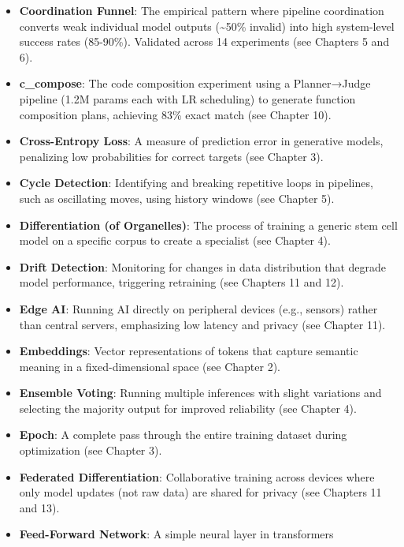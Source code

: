 \documentclass[
]{article}
\begin{document}
\begin{itemize}
  \textbf{Cosine Decay}: A learning rate schedule that smoothly reduces
  the learning rate following a cosine curve after warmup, preventing
  overfitting in later training (see Chapter 3).
\item
  \textbf{Coordination Funnel}: The empirical pattern where pipeline
  coordination converts weak individual model outputs
  (\textasciitilde50\% invalid) into high system-level success rates
  (85-90\%). Validated across 14 experiments (see Chapters 5 and 6).
\item
  \textbf{c\_compose}: The code composition experiment using a
  Planner→Judge pipeline (1.2M params each with LR scheduling) to
  generate function composition plans, achieving 83\% exact match (see
  Chapter 10).
\item
  \textbf{Cross-Entropy Loss}: A measure of prediction error in
  generative models, penalizing low probabilities for correct targets
  (see Chapter 3).
\item
  \textbf{Cycle Detection}: Identifying and breaking repetitive loops in
  pipelines, such as oscillating moves, using history windows (see
  Chapter 5).
\item
  \textbf{Differentiation (of Organelles)}: The process of training a
  generic stem cell model on a specific corpus to create a specialist
  (see Chapter 4).
\item
  \textbf{Drift Detection}: Monitoring for changes in data distribution
  that degrade model performance, triggering retraining (see Chapters 11
  and 12).
\item
  \textbf{Edge AI}: Running AI directly on peripheral devices (e.g.,
  sensors) rather than central servers, emphasizing low latency and
  privacy (see Chapter 11).
\item
  \textbf{Embeddings}: Vector representations of tokens that capture
  semantic meaning in a fixed-dimensional space (see Chapter 2).
\item
  \textbf{Ensemble Voting}: Running multiple inferences with slight
  variations and selecting the majority output for improved reliability
  (see Chapter 4).
\item
  \textbf{Epoch}: A complete pass through the entire training dataset
  during optimization (see Chapter 3).
\item
  \textbf{Federated Differentiation}: Collaborative training across
  devices where only model updates (not raw data) are shared for privacy
  (see Chapters 11 and 13).
\item
  \textbf{Feed-Forward Network}: A simple neural layer in transformers

\end{itemize}
\end{document}
